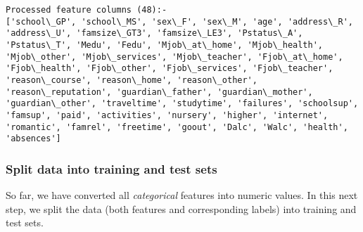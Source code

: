 \documentclass{article}
\begin{document}
    \begin{Verbatim}[commandchars=\\\{\}]
Processed feature columns (48):-
['school\_GP', 'school\_MS', 'sex\_F', 'sex\_M', 'age', 'address\_R', 'address\_U', 'famsize\_GT3', 'famsize\_LE3', 'Pstatus\_A', 'Pstatus\_T', 'Medu', 'Fedu', 'Mjob\_at\_home', 'Mjob\_health', 'Mjob\_other', 'Mjob\_services', 'Mjob\_teacher', 'Fjob\_at\_home', 'Fjob\_health', 'Fjob\_other', 'Fjob\_services', 'Fjob\_teacher', 'reason\_course', 'reason\_home', 'reason\_other', 'reason\_reputation', 'guardian\_father', 'guardian\_mother', 'guardian\_other', 'traveltime', 'studytime', 'failures', 'schoolsup', 'famsup', 'paid', 'activities', 'nursery', 'higher', 'internet', 'romantic', 'famrel', 'freetime', 'goout', 'Dalc', 'Walc', 'health', 'absences']
    \end{Verbatim}

    \subsubsection{Split data into training and test
sets}\label{split-data-into-training-and-test-sets}

So far, we have converted all \emph{categorical} features into numeric
values. In this next step, we split the data (both features and
corresponding labels) into training and test sets.
\end{document}
